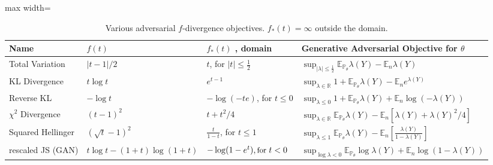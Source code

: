 \documentclass[12pt]{article}
\theoremstyle{myplain}
\theoremstyle{definition}
\theoremstyle{definition}
\theoremstyle{remark}
\numberwithin{equation}{section}
\begin{document}
\begin{table}[h!]
\label{tab:fdiv}
\begin{adjustbox}{max width=\textwidth}
\begin{tabular}{l|l|l|l}
Name                & $f(t)$    & $f_*(t)$ , domain            & Generative Adversarial Objective for $\theta$  \\ \hline
Total Variation     & $|t-1|/2$ & $t$, for $|t| \leq \frac{1}{2}$  & $\sup_{|\lambda|\leq \frac{1}{2}} \mathbb{E}_{\mathbb{P}_\theta} \lambda(Y)-\mathbb{E}_n \lambda(Y)$ \\
KL Divergence       & $t\log t$ & $e^{t-1}$                                    & $\sup_{\lambda\in\mathbb{R}} 1 + \mathbb{E}_{\mathbb{P}_\theta} \lambda(Y)-\mathbb{E}_n e^{\lambda(Y)}$                                                                                                                      \\
Reverse KL       & $-\log t$ & $-\log(-te)$, for $t\leq0$       & $\sup_{\lambda\leq 0} 1 + \mathbb{E}_{\mathbb{P}_\theta} \lambda(Y)+\mathbb{E}_n \log(-\lambda(Y))$    \\
$\chi^2$ Divergence & $(t-1)^2$ & $t+t^2/4$                                    & $\sup_{\lambda\in\mathbb{R}} \mathbb{E}_{\mathbb{P}_\theta} \lambda(Y)-\mathbb{E}_n \left[\lambda(Y) + \lambda(Y)^2/4 \right]$        \\
Squared Hellinger & $(\sqrt{t}-1)^2$ & $\frac{t}{1-t}$, for $ t\leq 1$ & $\sup_{\lambda\leq 1} \mathbb{E}_{\mathbb{P}_\theta} \lambda(Y)-\mathbb{E}_n \left[\frac{\lambda(Y)}{1-\lambda(Y)}\right]$ \\
rescaled JS (GAN) & $t\log t-(1+t)\log(1+t)$ &$\begin{matrix}\small{-\log(1-e^t)}, \text{for } t<0\end{matrix}$ &  $\sup_{\log\lambda<0} \mathbb{E}_{\mathbb{P}_\theta} \log\lambda(Y)+\mathbb{E}_n\log(1-\lambda(Y))$ 
\end{tabular}
\end{adjustbox}
\caption{Various adversarial $f$-divergence objectives. $f_*(t)=\infty$ outside the domain.}
\end{table}
\end{document}

